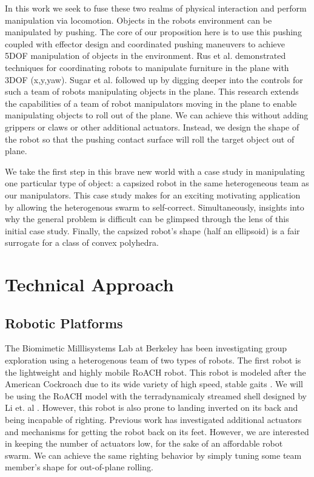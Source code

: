 \documentclass[runningheads,a4paper]{llncs}
\begin{document}
In this work we seek to fuse these two realms of physical interaction and perform manipulation via locomotion.
Objects in the robots environment can be manipulated by pushing.
The core of our proposition here is to use this pushing coupled with effector design and coordinated pushing maneuvers to achieve 5DOF manipulation of objects in the environment.
Rus et al.\cite{rus1995moving} demonstrated techniques for coordinating robots to manipulate furniture in the plane with 3DOF (x,y,yaw).
Sugar et al. \cite{sugar2002control} followed up by digging deeper into the controls for such a team of robots manipulating objects in the plane.
This research extends the capabilities of a team of robot manipulators moving in the plane to enable manipulating objects to roll out of the plane.
We can achieve this without adding grippers or claws or other additional actuators.
Instead, we design the shape of the robot so that the pushing contact surface will roll the target object out of plane.

We take the first step in this brave new world with a case study in manipulating one particular type of object: a capsized robot in the same heterogeneous team as our manipulators.
This case study makes for an exciting motivating application by allowing the heterogenous swarm to self-correct.
Simultaneously, insights into why the general problem is difficult can be glimpsed through the lens of this initial case study.
Finally, the capsized robot's shape (half an ellipsoid) is a fair surrogate for a class of convex polyhedra.

\clearpage
\section{Technical Approach}
\subsection{Robotic Platforms}
The Biomimetic Milllisystems Lab at Berkeley has been investigating group exploration using a heterogenous team of two types of robots.
The first robot is the lightweight and highly mobile RoACH robot.
This robot is modeled after the American Cockroach due to its wide variety of high speed, stable gaits \cite{RoACH}.
We will be using the RoACH model with the terradynamicaly streamed shell designed by Li et. al \cite{li2015terradynamically}.
However, this robot is also prone to landing inverted on its back and being incapable of righting.
Previous work \cite{SelfFlip} has investigated additional actuators and mechanisms for getting the robot back on its feet.
However, we are interested in keeping the number of actuators low, for the sake of an affordable robot swarm.
We can achieve the same righting behavior by simply tuning some team member's shape for out-of-plane rolling.
\end{document}
